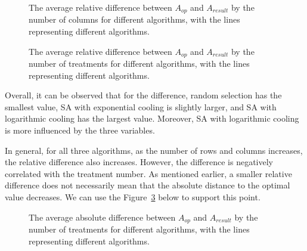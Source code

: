 \documentclass[
  a4paper,
  oneside,
  openany,
  12pt,
  onecolumn]{book}
\theoremstyle{definition}
\theoremstyle{definition}
\theoremstyle{plain}
\theoremstyle{remark}
\begin{document}
\begin{figure}


\caption{\label{fig-CvD}The average relative difference between
\(A_{op}\) and \(A_{result}\) by the number of columns for different
algorithms, with the lines representing different algorithms.}

\end{figure}%

\begin{figure}


\caption{\label{fig-TvD}The average relative difference between
\(A_{op}\) and \(A_{result}\) by the number of treatments for different
algorithms, with the lines representing different algorithms.}

\end{figure}%

Overall, it can be observed that for the difference, random selection
has the smallest value, SA with exponential cooling is slightly larger,
and SA with logarithmic cooling has the largest value. Moreover, SA with
logarithmic cooling is more influenced by the three variables.

In general, for all three algorithms, as the number of rows and columns
increases, the relative difference also increases. However, the
difference is negatively correlated with the treatment number. As
mentioned earlier, a smaller relative difference does not necessarily
mean that the absolute distance to the optimal value decreases. We can
use the Figure~\ref{fig-TvDabs} below to support this point.

\begin{figure}


\caption{\label{fig-TvDabs}The average absolute difference between
\(A_{op}\) and \(A_{result}\) by the number of treatments for different
algorithms, with the lines representing different algorithms.}

\end{figure}%
\end{document}
